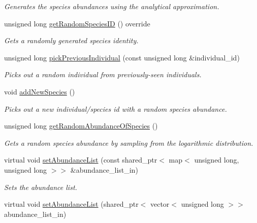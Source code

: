 \begin{DoxyCompactItemize}
\begin{DoxyCompactList}\small\item\em Generates the species abundances using the analytical approximation. \end{DoxyCompactList}\item 
unsigned long \hyperlink{class_analytical_species_abundances_handler_aa24c47038c2f6ac55307a95d7c6dcb4e}{get\+Random\+Species\+ID} () override
\begin{DoxyCompactList}\small\item\em Gets a randomly generated species identity. \end{DoxyCompactList}\item 
unsigned long \hyperlink{class_analytical_species_abundances_handler_a818c3563cfd4a0fa84e17b448252b764}{pick\+Previous\+Individual} (const unsigned long \&individual\+\_\+id)
\begin{DoxyCompactList}\small\item\em Picks out a random individual from previously-\/seen individuals. \end{DoxyCompactList}\item 
void \hyperlink{class_analytical_species_abundances_handler_a325cd35f3d6c3c1ccdf9cfac6060475e}{add\+New\+Species} ()
\begin{DoxyCompactList}\small\item\em Picks out a new individual/species id with a random species abundance. \end{DoxyCompactList}\item 
unsigned long \hyperlink{class_analytical_species_abundances_handler_a5521f4825daa9d9180930cef646cf281}{get\+Random\+Abundance\+Of\+Species} ()
\begin{DoxyCompactList}\small\item\em Gets a random species abundance by sampling from the logarithmic distribution. \end{DoxyCompactList}\item 
virtual void \hyperlink{class_species_abundances_handler_a4c0a67df18c6af25463044796abd77d5}{set\+Abundance\+List} (const shared\+\_\+ptr$<$ map$<$ unsigned long, unsigned long $>$$>$ \&abundance\+\_\+list\+\_\+in)
\begin{DoxyCompactList}\small\item\em Sets the abundance list. \end{DoxyCompactList}\item 
virtual void \hyperlink{class_species_abundances_handler_ae838648ecd291e74309a6b32634dc776}{set\+Abundance\+List} (shared\+\_\+ptr$<$ vector$<$ unsigned long $>$$>$ abundance\+\_\+list\+\_\+in)

\end{DoxyCompactItemize}
